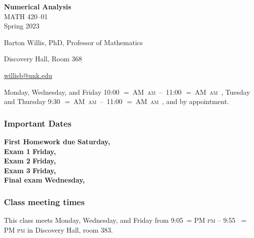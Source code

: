 \documentclass[12pt,fullpage]{article}
\makeatletter
\newcounter{ex}\setcounter{ex}{0}
\newenvironment{mypar}[2]
  {\begin{list}{}%
    {\setlength\leftmargin{#1}
    \setlength\rightmargin{#2}}
    \item[]}
  {\end{list}}
\renewenvironment{description}[0]{\begin{compactdesc}}{\end{compactdesc}}
\DeclareRobustCommand{\maybefakesc}[1]{%
  \ifnum\pdfstrcmp{\f@series}{\bfdefault}=\z@
    {\fontsize{\dimexpr0.8\dimexpr\f@size pt\relax}{0}\selectfont\uppercase{#1}}%
  \else
    \textsc{#1}%
  \fi
}
\newcommand\AM{\,\maybefakesc{am}\xspace}
\newcommand\PM{\,\maybefakesc{pm}\xspace}
\newcommand{\coursename}{Numerical Analysis}
\newcommand{\coursenumber}{MATH 420}
\newcommand{\sectionnumber}{01}
\newcommand{\term}{Spring }
\newcommand{\room}{Discovery Hall, room  383}
\newcommand{\meetingtime}{This class meets Monday, Wednesday, and Friday  from 
	9:05\PM{}  --  9:55 \PM}
\newcommand{\ay}{2023}
\newcommand{\officehours}{ Monday, Wednesday, and Friday \mbox{10:00\AM{} -- 11:00\AM},
    Tuesday and Thursday \mbox{9:30\AM -- 11:00\AM}, and by appointment.}
\makeatother
\begin{document}
\cleanlookdateon%
\shortdate
\printyearoff
\large
\begin{center}
    \textbf{\coursename}  \\
    {\coursenumber--\sectionnumber} \\
     {\term \ay} \\
\end{center}

\vskip0.25in
\normalsize

\begin{center}
    \begin{description}
        \item[Instructor:] Barton Willis, PhD, Professor of Mathematics
        \item[Office:]  Discovery Hall, Room 368
        \item[\phone:]   
        \item[\Email:]    \href{mailto:willisb@unk.edu}{willisb@unk.edu}
        \item[Office Hours:] \officehours
      \end{description}
    \end{center}

    \subsubsection*{Important Dates}

\begin{mypar}{0.25in}{0.25in} 

      \textbf{First Homework due} \dotfill  \textbf{Saturday, }  \\
       \textbf{Exam 1} \dotfill \textbf{Friday, }  \\
    \textbf{Exam 2} \dotfill  \textbf{Friday, } \\
    \textbf{Exam 3} \dotfill \textbf{Friday, } \\
         \textbf{Final exam} \dotfill  \textbf{Wednesday, }
\end{mypar}
    \subsubsection*{Class meeting times}

\meetingtime{} in \room.
\end{document}
